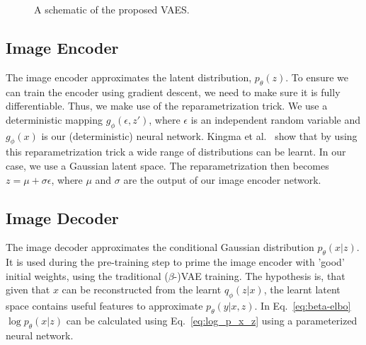 \begin{figure}[h]
    \centering
    \hphantom{space}
    \caption{A schematic of the proposed VAES.}
\end{figure}

\subsection{Image Encoder}
The image encoder approximates the latent distribution, $p_\theta(z)$. To ensure we can train the encoder using gradient descent, we need to make sure it is fully differentiable. Thus, we make use of the reparametrization trick. We use a deterministic mapping $g_\phi(\epsilon, z')$, where $\epsilon$ is an independent random variable and $g_\phi(x)$ is our (deterministic) neural network. Kingma et al.~\cite{kingma2014autoencodingvariationalbayes} show that by using this reparametrization trick a wide range of distributions can be learnt. In our case, we use a Gaussian latent space. The reparametrization then becomes $z = \mu + \sigma \epsilon$, where $\mu$ and $\sigma$ are the output of our image encoder network.

\subsection{Image Decoder}
The image decoder approximates the conditional Gaussian distribution $p_\theta(x|z)$. It is used during the pre-training step to prime the image encoder with 'good' initial weights, using the traditional ($\beta$-)VAE training. The hypothesis is, that given that $x$ can be reconstructed from the learnt $q_\phi(z|x)$, the learnt latent space contains useful features to approximate $p_\theta(y|x,z)$. In Eq.~\ref{eq:beta-elbo} $\log p_\theta(x|z)$ can be calculated using Eq.~\ref{eq:log_p_x_z} using a parameterized neural network.

